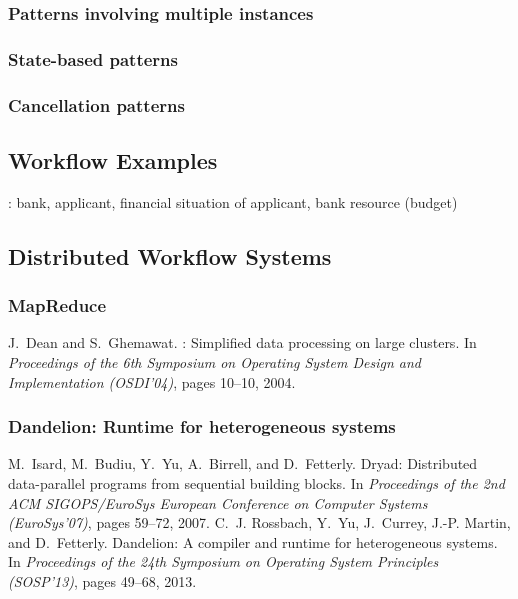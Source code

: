 \documentclass{myproc}
\begin{document}
\subsubsection{Patterns involving multiple instances}
\bit
\w {}
\w {}
\w {}
\w {}
\eit
\subsubsection{State-based patterns}
\subsubsection{Cancellation patterns}

\subsection{Workflow Examples}
\bit
\w {}: bank, applicant, financial situation of
applicant, bank resource (budget)
\eit


\subsection{Distributed Workflow Systems}
\subsubsection{MapReduce}
\bit
\w J.~Dean and S.~Ghemawat.
: {Simplified} data processing on large clusters.
\newblock In {\em Proceedings of the 6th Symposium on Operating System Design
  and Implementation (OSDI'04)}, pages 10--10, 2004.
\eit


\subsubsection{\textcolor{red2}{\bf{}Dandelion: Runtime for heterogeneous
    systems}} 
\bit
\w M.~Isard, M.~Budiu, Y.~Yu, A.~Birrell, and D.~Fetterly.
\newblock Dryad: Distributed data-parallel programs from sequential building
  blocks.
\newblock In {\em Proceedings of the 2nd ACM SIGOPS/EuroSys European Conference
  on Computer Systems (EuroSys'07)}, pages 59--72, 2007.
\w C.~J. Rossbach, Y.~Yu, J.~Currey, J.-P. Martin, and D.~Fetterly.
\newblock Dandelion: A compiler and runtime for heterogeneous systems.
\newblock In {\em Proceedings of the 24th Symposium on Operating 
                  System Principles (SOSP'13)}, pages 49--68, 2013.
\eit
\end{document}
